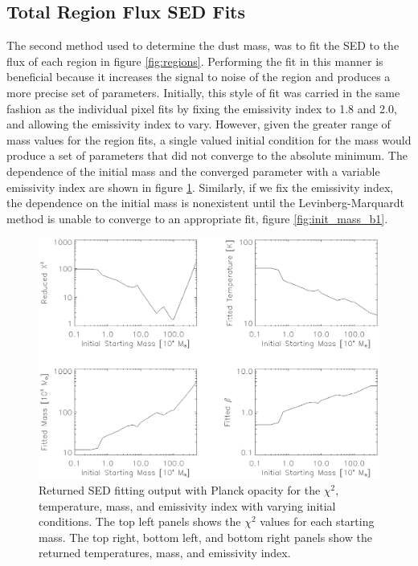 \subsection{Total Region Flux SED Fits}

The second method used to determine the dust mass, was to fit the SED to the flux of each region in figure \ref{fig:regions}.  Performing the fit in this manner is beneficial because it increases the signal to noise of the region and produces a more precise set of parameters.  Initially, this style of fit was carried in the same fashion as the individual pixel fits  by fixing the emissivity index to 1.8 and 2.0, and allowing the emissivity index to vary.   However, given the greater range of mass values for the region fits, a single valued initial condition for the mass would produce a set of parameters that did not converge to the absolute minimum.  The dependence of the initial mass and the converged parameter with a variable emissivity index are shown in figure \ref{fig:init_mass_bf}.  Similarly, if we fix the emissivity index, the dependence on the initial mass is nonexistent until the Levinberg-Marquardt method is unable to converge to an appropriate fit, figure \ref{fig:init_mass_b1}.

\begin{figure}
  \centering
  \includegraphics[width=1.\textwidth]{sed_imgs/beta_f_return.eps}
  \caption[Initial Mass Dependence and Convergence of SED Fits for Region Fluxes and Variable Emissivity Index]{Returned SED fitting output with Planck opacity for the $\chi^2$, temperature, mass, and emissivity index with varying initial conditions.  The top left panels shows the $\chi^2$ values for each starting mass.  The top right, bottom left, and bottom right panels show the returned temperatures, mass, and emissivity index.}
  \label{fig:init_mass_bf}
\end{figure}

